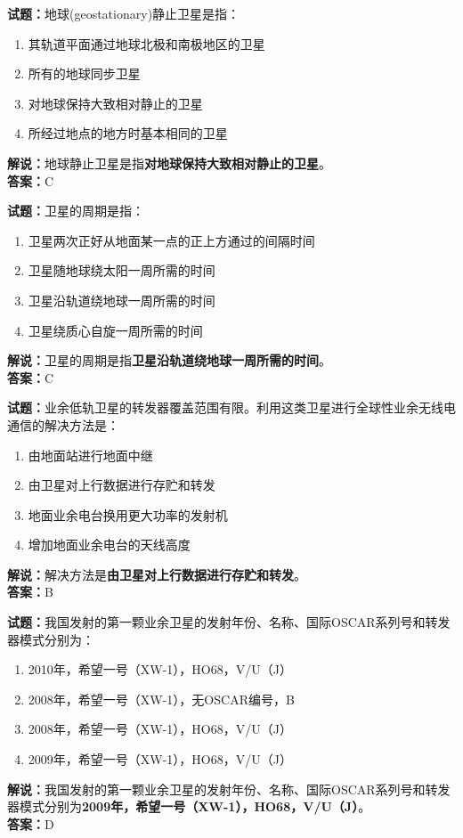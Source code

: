 \documentclass{ctexbook}
\begin{document}
\bigskip


\noindent\textbf{试题：}地球(geostationary)静止卫星是指：
\begin{enumerate}[leftmargin=3em]
\item 其轨道平面通过地球北极和南极地区的卫星
\item 所有的地球同步卫星
\item 对地球保持大致相对静止的卫星
\item 所经过地点的地方时基本相同的卫星
\end{enumerate}
\noindent\textbf{解说：}地球静止卫星是指\textbf{对地球保持大致相对静止的卫星}。\\\noindent\textbf{答案：}C




\bigskip


\noindent\textbf{试题：}卫星的周期是指：
\begin{enumerate}[leftmargin=3em]
\item 卫星两次正好从地面某一点的正上方通过的间隔时间
\item 卫星随地球绕太阳一周所需的时间
\item 卫星沿轨道绕地球一周所需的时间
\item 卫星绕质心自旋一周所需的时间
\end{enumerate}
\noindent\textbf{解说：}卫星的周期是指\textbf{卫星沿轨道绕地球一周所需的时间}。\\\noindent\textbf{答案：}C



\bigskip


\noindent\textbf{试题：}业余低轨卫星的转发器覆盖范围有限。利用这类卫星进行全球性业余无线电通信的解决方法是：
\begin{enumerate}[leftmargin=3em]
\item 由地面站进行地面中继
\item 由卫星对上行数据进行存贮和转发
\item 地面业余电台换用更大功率的发射机
\item 增加地面业余电台的天线高度
\end{enumerate}
\noindent\textbf{解说：}解决方法是\textbf{由卫星对上行数据进行存贮和转发}。\\\noindent\textbf{答案：}B




\bigskip


\noindent\textbf{试题：}我国发射的第一颗业余卫星的发射年份、名称、国际OSCAR系列号和转发器模式分别为：
\begin{enumerate}[leftmargin=3em]
\item 2010年，希望一号（XW-1），HO68，V/U（J）
\item 2008年，希望一号（XW-1），无OSCAR编号，B
\item 2008年，希望一号（XW-1），HO68，V/U（J）
\item 2009年，希望一号（XW-1），HO68，V/U（J）
\end{enumerate}
\noindent\textbf{解说：}我国发射的第一颗业余卫星的发射年份、名称、国际OSCAR系列号和转发器模式分别为\textbf{2009年，希望一号（XW-1），HO68，V/U（J）}。\\\noindent\textbf{答案：}D
\end{document}
